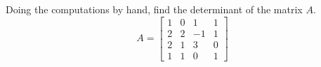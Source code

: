 Doing the computations by hand, find the determinant of the matrix $A$. 
%
\begin{equation*}
A= 
\begin{bmatrix}
1 & 0 & 1 & 1\\
2 & 2 & -1 & 1\\
2 & 1 & 3 & 0\\ 
1 & 1 & 0 & 1
\end{bmatrix}
\end{equation*}